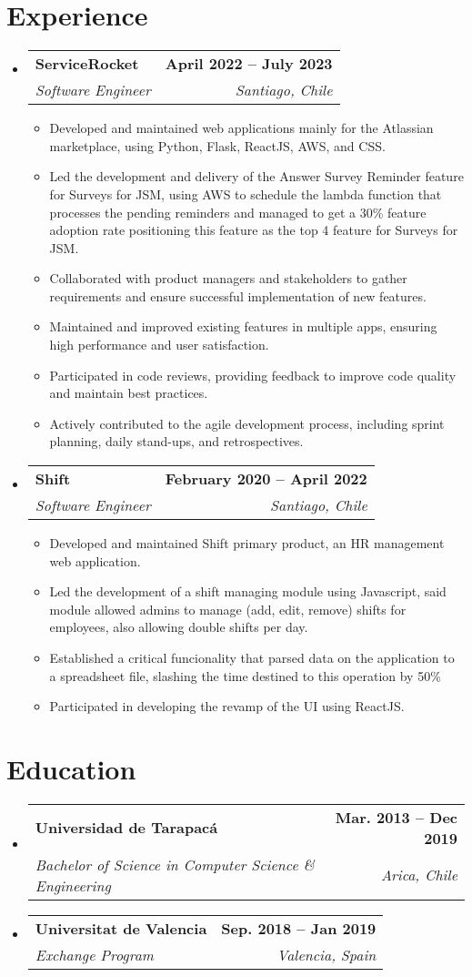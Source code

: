 \documentclass[letterpaper,11pt]{article}
\makeatletter
\newcommand{\resumeItem}[1]{
  \item\small{
    {#1 \vspace{-2pt}}
  }
}
\newcommand{\resumeSubheading}[4]{
  \vspace{-2pt}\item
    \begin{tabular*}{1.0\textwidth}[t]{l@{\extracolsep{\fill}}r}
      \textbf{#1} & \textbf{\small #2} \\
      \textit{\small#3} & \textit{\small #4} \\
    \end{tabular*}\vspace{-7pt}
}
\newcommand{\resumeSubHeadingListStart}{\begin{itemize}[leftmargin=0.0in, label={}]}
\newcommand{\resumeSubHeadingListEnd}{\end{itemize}}
\newcommand{\resumeItemListStart}{\begin{itemize}}
\newcommand{\resumeItemListEnd}{\end{itemize}\vspace{-5pt}}
\makeatother
\begin{document}
\section{Experience}
  \resumeSubHeadingListStart

    \resumeSubheading
      {ServiceRocket}{April 2022 -- July 2023}
      {Software Engineer}{Santiago, Chile}
      \resumeItemListStart
        \resumeItem{Developed and maintained web applications mainly for the Atlassian marketplace,
        using Python, Flask, ReactJS, AWS, and CSS.}
        \resumeItem{Led the development and delivery of the Answer Survey Reminder feature for
        Surveys for JSM, using AWS to schedule the lambda function that processes the 
        pending reminders and managed to get a 30\% feature adoption rate positioning this feature
        as the top 4 feature for Surveys for JSM.}
        \resumeItem{Collaborated with product managers and stakeholders to gather requirements
        and ensure successful implementation of new features.}
        \resumeItem{Maintained and improved existing features in multiple apps, ensuring high
        performance and user satisfaction.}
        \resumeItem{Participated in code reviews, providing feedback to improve code quality and
        maintain best practices.}
        \resumeItem{Actively contributed to the agile development process, including sprint
        planning, daily stand-ups, and retrospectives.}
      \resumeItemListEnd
    \resumeSubheading
      {Shift}{February 2020 -- April 2022}
      {Software Engineer}{Santiago, Chile}
      \resumeItemListStart
      	\resumeItem{Developed and maintained Shift primary product, an HR management web application.}
        \resumeItem{Led the development of a shift managing module using Javascript, said module
        allowed admins to manage (add, edit, remove) shifts for employees, also allowing double 
        shifts per day.}
        \resumeItem{Established a critical funcionality that parsed data on the application to a
        spreadsheet file, slashing the time destined to this operation by 50\%}
        \resumeItem{Participated in developing the revamp of the UI using ReactJS.}
      \resumeItemListEnd  
  \resumeSubHeadingListEnd
\vspace{-16pt}


\section{Education}
  \resumeSubHeadingListStart
    \resumeSubheading
      {Universidad de Tarapacá}{Mar. 2013 -- Dec 2019}
      {Bachelor of Science in Computer Science \& Engineering}{Arica, Chile}
    \resumeSubheading
      {Universitat de Valencia}{Sep. 2018 -- Jan 2019}
      {Exchange Program}{Valencia, Spain}
  \resumeSubHeadingListEnd
\end{document}
